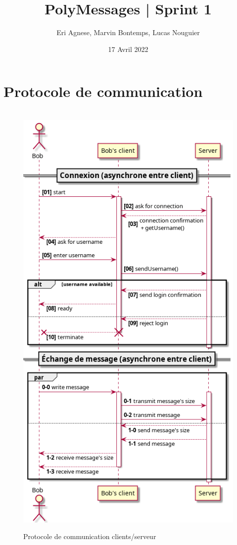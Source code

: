 \documentclass[a4paper,12pt]{article}
\title{PolyMessages | Sprint 1}
\author{Eri Agnese, Marvin Bontemps, Lucas Nouguier}
\date{17 Avril 2022}
\begin{document}
\maketitle
\tableofcontents
\clearpage
\hypersetup{linkcolor=red}


\section{Protocole de communication}
\begin{figure}[h]
	\centering
	\hrulefill\\
	\includegraphics[width=0.925\linewidth]{sequence.png}
	\caption{Protocole de communication clients/serveur}
	\hrulefill
\end{figure}
\end{document}
